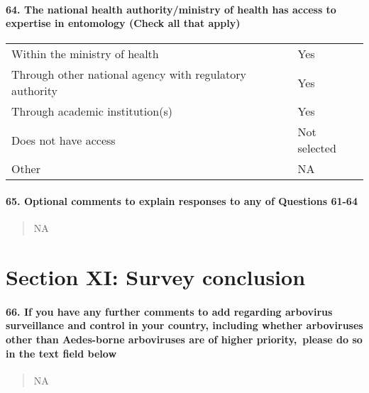 \documentclass[
]{article}
\begin{document}
\hypertarget{the-national-health-authorityministry-of-health-has-access-to-expertise-in-entomology-check-all-that-apply}{%
\paragraph{64. The national health authority/ministry of health has
access to expertise in entomology (Check all that
apply)}\label{the-national-health-authorityministry-of-health-has-access-to-expertise-in-entomology-check-all-that-apply}}

\begin{longtable}[]{@{}ll@{}}
\toprule
\endhead
Within the ministry of health & Yes \\
Through other national agency with regulatory authority & Yes \\
Through academic institution(s) & Yes \\
Does not have access & Not selected \\
Other & NA \\
\bottomrule
\end{longtable}

\hypertarget{optional-comments-to-explain-responses-to-any-of-questions-61-64}{%
\paragraph{65. Optional comments to explain responses to any of
Questions
61-64}\label{optional-comments-to-explain-responses-to-any-of-questions-61-64}}

\begin{quote}
NA
\end{quote}

\hypertarget{section-xi-survey-conclusion}{%
\section{Section XI: Survey
conclusion}\label{section-xi-survey-conclusion}}

\hypertarget{if-you-have-any-further-comments-to-add-regarding-arbovirus-surveillance-and-control-in-your-country-including-whether-arboviruses-other-than-aedes-borne-arboviruses-are-of-higher-priority-please-do-so-in-the-text-field-below}{%
\paragraph{66. If you have any further comments to add regarding
arbovirus surveillance and control in your country, including whether
arboviruses other than Aedes-borne arboviruses are of higher
priority,~please do so in the text field
below}\label{if-you-have-any-further-comments-to-add-regarding-arbovirus-surveillance-and-control-in-your-country-including-whether-arboviruses-other-than-aedes-borne-arboviruses-are-of-higher-priority-please-do-so-in-the-text-field-below}}

\begin{quote}
NA
\end{quote}
\end{document}
